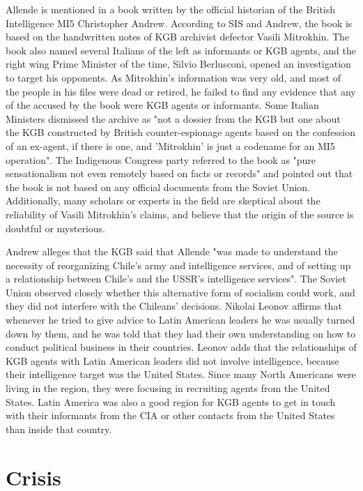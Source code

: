 Allende is mentioned in a book written by the official historian of the
British Intelligence MI5 Christopher Andrew. According to SIS and
Andrew, the book is based on the handwritten notes of KGB archivist
defector Vasili Mitrokhin. The book also named several Italians of the
left as informants or KGB agents, and the right wing Prime Minister of
the time, Silvio Berlusconi, opened an investigation to target his
opponents. As Mitrokhin's information was very old, and most of the
people in his files were dead or retired, he failed to find any evidence
that any of the accused by the book were KGB agents or informants. Some
Italian Ministers dismissed the archive as "not a dossier from the KGB
but one about the KGB constructed by British counter-espionage agents
based on the confession of an ex-agent, if there is one, and 'Mitrokhin'
is just a codename for an MI5 operation". The Indigenous Congress party
referred to the book as "pure sensationalism not even remotely based on
facts or records" and pointed out that the book is not based on any
official documents from the Soviet Union. Additionally, many scholars or
experts in the field are skeptical about the reliability of Vasili
Mitrokhin's claims, and believe that the origin of the source is
doubtful or mysterious.

Andrew alleges that the KGB said that Allende "was made to understand
the necessity of reorganizing Chile's army and intelligence services,
and of setting up a relationship between Chile's and the USSR's
intelligence services". The Soviet Union observed closely whether this
alternative form of socialism could work, and they did not interfere
with the Chileans' decisions. Nikolai Leonov affirms that whenever he
tried to give advice to Latin American leaders he was usually turned
down by them, and he was told that they had their own understanding on
how to conduct political business in their countries. Leonov adds that
the relationships of KGB agents with Latin American leaders did not
involve intelligence, because their intelligence target was the United
States. Since many North Americans were living in the region, they were
focusing in recruiting agents from the United States. Latin America was
also a good region for KGB agents to get in touch with their informants
from the CIA or other contacts from the United States than inside that
country.

\section{Crisis}\label{crisis}

